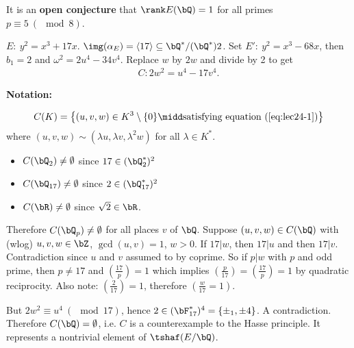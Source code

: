 It is an \textbf{open conjecture} that $\rank E(\bQ) = 1$ for all primes $p \equiv 5 ~ (\mod 8)$.

\begin{example}[Lind]
	$E: ~y^2 = x^3 + 17x$. $\img(\alpha_E) = \langle 17 \rangle\subseteq \bQ^*/(\bQ^*)2$. Set $E':~ y^2 = x^3 - 68x$, then $b_1 = 2$ and $\omega^2 = 2u^4 - 34v^4$. Replace $w$ by $2w$ and divide by 2 to get
	\begin{align*}\label{eq:lec24-1}
		C: 2w^2 = u^4 - 17v^4.
	\end{align*}
\end{example}

\textbf{Notation:} 

\begin{align*}
	C(K) = \left\{(u,v,w) \in K^3 \setminus \{0\} \midd \text{satisfying equation (\ref{eq:lec24-1})}\right\}
\end{align*}
where $(u,v,w) \sim (\lambda u, \lambda v, \lambda^2 w)$ for all $\lambda \in K^*$.
\begin{itemize}
	\item $C(\bQ_2) \neq \emptyset$ since $17 \in (\bQ_2^*)^2$
	\item $C(\bQ_{17}) \neq \emptyset$ since $2 \in (\bQ_{17}^*)^2$
	\item $C(\bR) \neq \emptyset$ since $\sqrt{2} \in \bR$.
\end{itemize}
Therefore $C(\bQ_p) \neq \emptyset$ for all places $v$ of $\bQ$. Suppose $(u,v,w) \in C(\bQ)$ with (wlog) $u,v,w \in \bZ$, $\gcd(u,v) = 1$, $w > 0$. If $17 | w$, then $17 | u$ and then $17 | v$. Contradiction since $u$ and $v$ assumed to by coprime. So if $p | w$ with $p$ and odd prime, then $p\neq 17$ and $\left(\frac{17}{p}\right) = 1$ which implies $\left(\frac{p}{17}\right) = \left(\frac{17}{p}\right) = 1$ by quadratic reciprocity. Also note: $\left(\frac{2}{17}\right) = 1$, therefore $\left(\frac{w}{17} = 1\right)$. 

But $2w^2 \equiv u^4 ~(\mod 17)$, hence $2 \in (\bF_{17}^*)^4 = \{\pm_1, \pm 4\}$. A contradiction. Therefore $C(\bQ) = \emptyset$, i.e. $C$ is a counterexample to the Hasse principle. It represents a nontrivial element of $\tshaf(E/\bQ)$.

